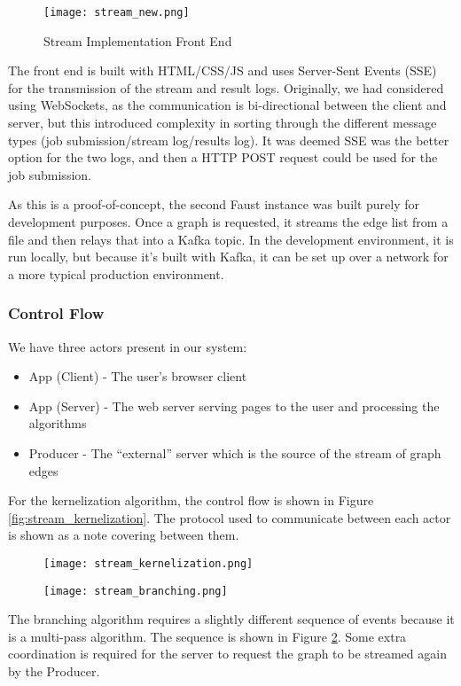 \begin{figure}[htb]
    \centering
    \texttt{[image: stream\_new.png]}
    \caption{Stream Implementation Front End}
    \label{fig:stream_font_end}
\end{figure}

The front end is built with HTML/CSS/JS and uses Server-Sent Events (SSE) for
the transmission of the stream and result logs. Originally, we had considered
using WebSockets, as the communication is bi-directional between the client and
server, but this introduced complexity in sorting through the different message
types (job submission/stream log/results log). It was deemed SSE was the better
option for the two logs, and then a HTTP POST request could be used for the job
submission.

As this is a proof-of-concept, the second Faust instance was built purely for
development purposes. Once a graph is requested, it streams the edge list from
a file and then relays that into a Kafka topic. In the development environment,
it is run locally, but because it's built with Kafka, it can be set up over a
network for a more typical production environment.

\subsubsection{Control Flow}

We have three actors present in our system:

\begin{itemize}
    \item
          App (Client) - The user's browser client
    \item
          App (Server) - The web server serving pages to the user and
          processing the algorithms
    \item
          Producer - The ``external'' server which is the source of the stream
          of graph edges
\end{itemize}

For the kernelization algorithm, the control flow is shown in Figure
\ref{fig:stream_kernelization}. The protocol used to communicate between each
actor is shown as a note covering between them.

\begin{figure}[htb]
    \centering
    \begin{minipage}{.5\textwidth}
        \centering
        \texttt{[image: stream\_kernelization.png]}
        \label{fig:stream_kernelization}
    \end{minipage}%
    \begin{minipage}{.5\textwidth}
        \centering
        \texttt{[image: stream\_branching.png]}
        \label{fig:stream_branching}
    \end{minipage}
\end{figure}

The branching algorithm requires a slightly different sequence of events
because it is a multi-pass algorithm. The sequence is shown in Figure
\ref{fig:stream_branching}. Some extra coordination is required for the server
to request the graph to be streamed again by the Producer.
